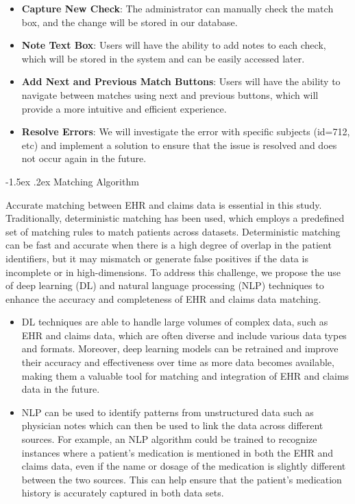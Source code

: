 \documentclass[11pt,]{article}
\makeatletter
\providecommand{\tightlist}{%
  \setlength{\itemsep}{0pt}\setlength{\parskip}{0pt}}
\renewcommand\paragraph{
  \@startsection{paragraph}{4}{\z@}
    {-0.5ex\@plus -1ex \@minus -.2ex}%
    {-1.5ex \@plus .2ex}%
    {\normalfont\normalsize\bf}} %
\makeatother
\begin{document}
\begin{itemize}
\tightlist
\item
  \textbf{Capture New Check}: The administrator can manually check the
  match box, and the change will be stored in our database.
\item
  \textbf{Note Text Box}: Users will have the ability to add notes to
  each check, which will be stored in the system and can be easily
  accessed later.
\item
  \textbf{Add Next and Previous Match Buttons}: Users will have the
  ability to navigate between matches using next and previous buttons,
  which will provide a more intuitive and efficient experience.
\item
  \textbf{Resolve Errors}: We will investigate the error with specific
  subjects (id=712, etc) and implement a solution to ensure that the
  issue is resolved and does not occur again in the future.
\end{itemize}

\paragraph{Matching Algorithm}\label{matching-algorithm}

Accurate matching between EHR and claims data is essential in this
study. Traditionally, deterministic matching has been used, which
employs a predefined set of matching rules to match patients across
datasets. Deterministic matching can be fast and accurate when there is
a high degree of overlap in the patient identifiers, but it may mismatch
or generate false positives if the data is incomplete or in
high-dimensions. To address this challenge, we propose the use of deep
learning (DL) and natural language processing (NLP) techniques to
enhance the accuracy and completeness of EHR and claims data matching.

\begin{itemize}
\tightlist
\item
  DL techniques are able to handle large volumes of complex data, such
  as EHR and claims data, which are often diverse and include various
  data types and formats. Moreover, deep learning models can be
  retrained and improve their accuracy and effectiveness over time as
  more data becomes available, making them a valuable tool for matching
  and integration of EHR and claims data in the future.
\item
  NLP can be used to identify patterns from unstructured data such as
  physician notes which can then be used to link the data across
  different sources. For example, an NLP algorithm could be trained to
  recognize instances where a patient's medication is mentioned in both
  the EHR and claims data, even if the name or dosage of the medication
  is slightly different between the two sources. This can help ensure
  that the patient's medication history is accurately captured in both
  data sets.
\end{itemize}
\end{document}
